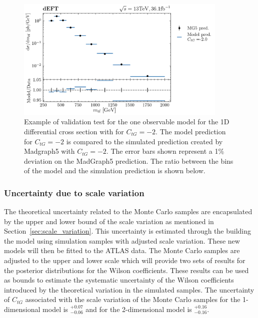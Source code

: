 \documentclass[a4paper,11pt]{article}
\begin{document}
\begin{figure}[htb]
    \centering
    \includegraphics[width=0.9\textwidth]{plots/validation_ATLAS-ctg_2_1D_1OP.png}
    \caption{Example of validation test for the one observable model for the 1D differential cross section with for $C_{tG}=-2$. The model prediction for $C_{tG}=-2$ is compared to the simulated prediction created by Madgraph5 with $C_{tG}=-2$. The error bars shown represent a 1\% deviation on the MadGraph5 prediction. The ratio between the bins of the model and the simulation prediction is shown below.}
    \label{fig:test_example}
\end{figure}

\subsubsection{Uncertainty due to scale variation}
The theoretical uncertainty related to the Monte Carlo samples are encapsulated by the upper and lower bound of the scale variation as mentioned in Section~\ref{sec:scale_variation}.
This uncertainty is estimated through the building the model using simulation samples with adjusted scale variation.
These new models will then be fitted to the ATLAS data.
The Monte Carlo samples are adjusted to the upper and lower scale which will provide two sets of results for the posterior distributions for the Wilson coefficients.
These results can be used as bounds to estimate the systematic uncertainty of the Wilson coefficients introduced by the theoretical variation in the simulated samples.
The uncertainty of $C_{tG}$ associated with the scale variation of the Monte Carlo samples for the 1-dimensional model is $^{+0.07}_{-0.06}$ and for the 2-dimensional model is $^{+0.16}_{-0.16}$.
\end{document}
